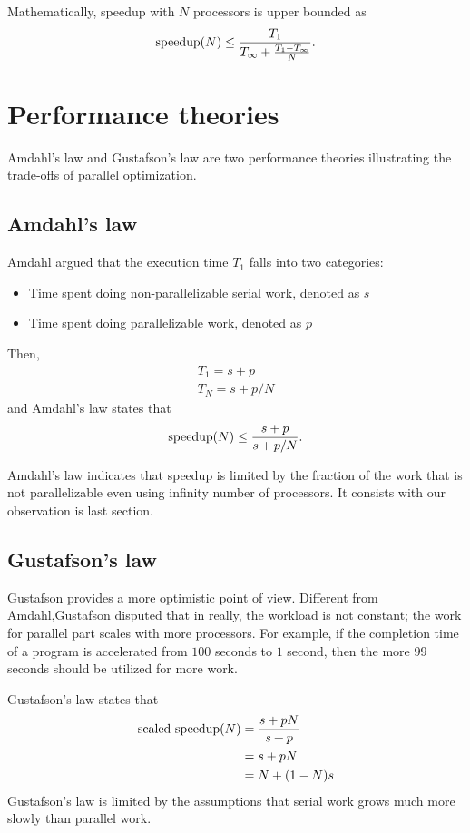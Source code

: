 \documentclass[twoside]{article}
\begin{document}
Mathematically, speedup with $N$ processors is upper bounded as
\begin{equation}
	\textnormal{speedup}(N)\leq \frac{T_1}{T_\infty + \frac{T_1 - T_\infty}{N}}.
\end{equation}

\section{Performance theories}
Amdahl's law and Gustafson's law are two performance theories illustrating the trade-offs of parallel optimization.
\subsection{Amdahl's law}
Amdahl argued that the execution time $T_1$ falls into two categories:
\begin{itemize}
	\item Time spent doing non-parallelizable serial work, denoted as $s$
	\item Time spent doing parallelizable work, denoted as $p$
\end{itemize}
Then, 
\begin{eqnarray}
T_1 = s + p\\
T_N = s + p/N
\end{eqnarray}
and Amdahl's law states that
\begin{equation}
\textnormal{speedup}(N)\leq \frac{s+p}{s+p/N}.
\end{equation}

Amdahl's law indicates that speedup is limited by the fraction of the work that is not parallelizable even using infinity number of processors. It consists with our observation is last section.

\subsection{Gustafson's law}
Gustafson provides a more optimistic point of view.
Different from Amdahl,Gustafson disputed that in really, the workload is not constant; the work for parallel part scales with more processors. For example, if the completion time of a program is accelerated from $100$ seconds to $1$ second, then the more $99$ seconds should be utilized for more work.

Gustafson's law states that
\begin{equation} \label{eq1}
\begin{split}
\textnormal{scaled speedup}(N) & = \frac{s+ pN}{s+p} \\
& = s + pN\\
& = N + (1-N)s
\end{split}
\end{equation}
Gustafson's law is limited by the assumptions that serial work grows much more slowly than parallel work.
\end{document}
